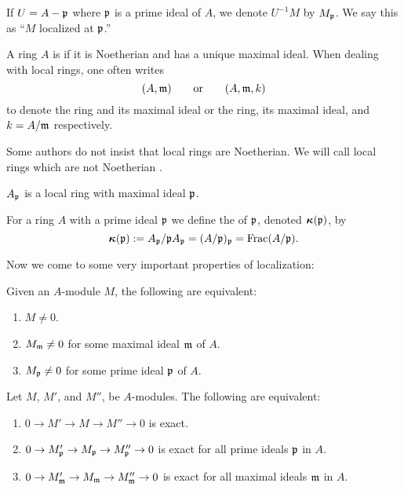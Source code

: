 \documentclass{ximera}
\begin{document}
\begin{definition} If $U = A-\mathfrak{p}$ where $\mathfrak{p}$ is a prime ideal of $A$, we denote $U^{-1}M$ by $M_\mathfrak p$. We say this as ``$M$ localized at $\mathfrak p$.''
\end{definition}


\begin{definition} A ring $A$ is  if it is Noetherian and has a unique maximal ideal. When dealing with local rings, one often writes
\[
(A,\mathfrak{m}) \qquad \text{or}\qquad (A,\mathfrak{m},k)
\]
to denote the ring and its maximal ideal or the ring, its maximal ideal, and $k = A/\mathfrak{m}$ respectively.
\end{definition}

\begin{remark} Some authors do not insist that local rings are Noetherian. We will call local rings which are not Noetherian .
\end{remark}


\begin{proposition} $A_\mathfrak p$ is a local ring with maximal ideal $\mathfrak p$. 
\end{proposition}


\begin{definition} For a ring $A$ with a prime ideal $\mathfrak{p}$ we define the  of $\mathfrak{p}$, denoted $\boldsymbol{\kappa}(\mathfrak{p})$, by
\[
\boldsymbol{\kappa}(\mathfrak{p}) := A_\mathfrak{p}/\mathfrak{p}A_\mathfrak{p}= (A/\mathfrak{p})_\mathfrak{p} = \operatorname{Frac}(A/\mathfrak{p}).
\] 
\end{definition}

Now we come to some very important properties of localization:

\begin{proposition} Given an $A$-module $M$, the following are equivalent:
\begin{enumerate}
\item $M \ne 0$.
\item $M_{\mathfrak{m}} \ne 0$ for some maximal ideal $\mathfrak{m}$ of $A$.
\item $M_{\mathfrak{p}} \ne 0$ for some prime ideal $\mathfrak{p}$ of $A$.
\end{enumerate}
\end{proposition}


\begin{corollary} Let $M$, $M'$, and $M''$, be $A$-modules. The following are equivalent:
\begin{enumerate}
\item $0\to M' \to M \to M'' \to 0$ is exact.
\item $0\to M'_{\mathfrak{p}} \to M_{\mathfrak{p}} \to M''_{\mathfrak{p}} \to 0$ is exact for all prime ideals $\mathfrak{p}$ in $A$.
\item $0\to M'_{\mathfrak{m}} \to M_{\mathfrak{m}} \to M''_{\mathfrak{m}} \to 0$ is exact for all maximal ideals $\mathfrak{m}$ in $A$.
\end{enumerate}
\end{corollary}
\end{document}
